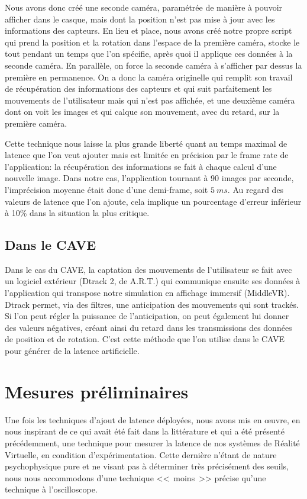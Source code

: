 	\par Nous avons donc créé une seconde caméra, paramétrée de manière à pouvoir afficher dans le casque, mais dont la position n'est pas mise à jour avec les informations des capteurs. En lieu et place, nous avons créé notre propre script qui prend la position et la rotation dans l'espace de la première caméra, stocke le tout pendant un temps que l'on spécifie, après quoi il applique ces données à la seconde caméra. En parallèle, on force la seconde caméra à s'afficher par dessus la première en permanence. On a donc la caméra originelle qui remplit son travail de récupération des informations des capteurs et qui suit parfaitement les mouvements de l'utilisateur mais qui n'est pas affichée, et une deuxième caméra dont on voit les images et qui calque son mouvement, avec du retard, sur la première caméra.
	
	
	\par Cette technique nous laisse la plus grande liberté quant au temps maximal de latence que l'on veut ajouter mais est limitée en précision par le frame rate de l'application: la récupération des informations se fait à chaque calcul d'une nouvelle image. Dans notre cas, l'application tournant à 90 images par seconde, l'imprécision moyenne était donc d'une demi-frame, soit $5~ms$. Au regard des valeurs de latence que l'on ajoute, cela implique un pourcentage d'erreur inférieur à 10\% dans la situation la plus critique.
	
	\subsection{Dans le CAVE}	
	\par Dans le cas du CAVE, la captation des mouvements de l'utilisateur se fait avec un logiciel extérieur (Dtrack 2, de A.R.T.) qui communique ensuite ses données à l'application qui transpose notre simulation en affichage immersif (MiddleVR). Dtrack permet, via des filtres, une anticipation des mouvements qui sont trackés. Si l'on peut régler la puissance de l'anticipation, on peut également lui donner des valeurs négatives, créant ainsi du retard dans les transmissions des données de position et de rotation. C'est cette méthode que l'on utilise dans le CAVE pour générer de la latence artificielle.
	
	
	\section{Mesures préliminaires}
	\label{sec:mesures_prelim_latence}
	\par Une fois les techniques d'ajout de latence déployées, nous avons mis en œuvre, en nous inspirant de ce qui avait été fait dans la littérature et qui a été présenté précédemment, une technique pour mesurer la latence de nos systèmes de Réalité Virtuelle, en condition d'expérimentation. Cette dernière n'étant de nature psychophysique pure et ne visant pas à déterminer très précisément des seuils, nous nous accommodons d'une technique <<~moins~>> précise qu'une technique à l'oscilloscope.
	
